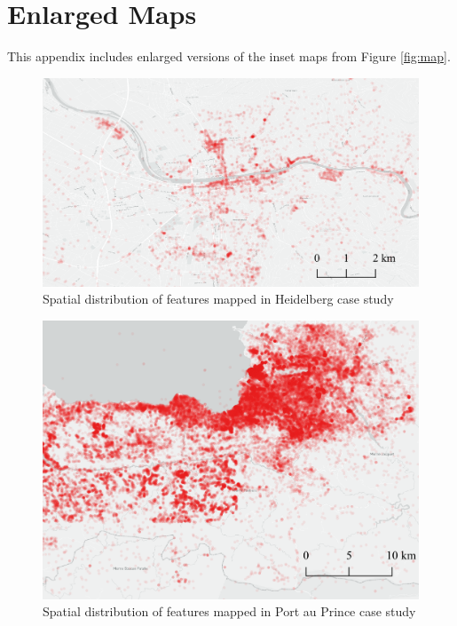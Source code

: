 \appendix

\chapter{Enlarged Maps}
\label{appendixlabel1}

This appendix includes enlarged versions of the inset maps from Figure \ref{fig:map}.

\begin{figure}[H] %
    \centering %
    \includegraphics[width = \textwidth]{Images/hed_2.png} %
    \caption{Spatial distribution of features mapped in Heidelberg case study} %
\end{figure}


\begin{figure} %
    \centering %
    \includegraphics[width = \textwidth]{Images/pap_2.png} %
    \caption{Spatial distribution of features mapped in Port au Prince case study} %
\end{figure}

